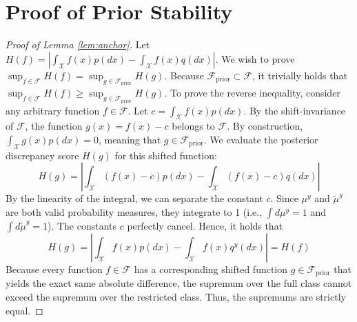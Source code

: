 \documentclass[twoside,11pt]{article}
\begin{document}
\section{Proof of Prior Stability}
\label{sec:appendix_prior_proof}
\begin{proof}[Proof of Lemma \ref{lem:anchor}]
    Let $H(f) = \left| \int_{\mathcal{X}} f(x) p(dx) - \int_{\mathcal{X}} f(x) q(dx) \right|$. We wish to prove $\sup_{f \in \mathcal{F}} H(f) = \sup_{g \in \mathcal{F}_{\text{prior}}} H(g)$. Because $\mathcal{F}_{\text{prior}} \subset \mathcal{F}$, it trivially holds that $\sup_{f \in \mathcal{F}} H(f) \ge \sup_{g \in \mathcal{F}_{\text{prior}}} H(g)$. To prove the reverse inequality, consider any arbitrary function $f \in \mathcal{F}$. Let $c = \int_{\mathcal{X}} f(x) p(dx)$. By the shift-invariance of $\mathcal{F}$, the function $g(x) = f(x) - c$ belongs to $\mathcal{F}$. By construction, $\int_{\mathcal{X}} g(x) p(dx) = 0$, meaning that $g \in \mathcal{F}_{\text{prior}}$. We evaluate the posterior discrepancy score $H(g)$ for this shifted function:$$H(g) = \left| \int_{\mathcal{X}} (f(x) - c) p(dx) - \int_{\mathcal{X}} (f(x) - c) q(dx) \right|$$ 
    By the linearity of the integral, we can separate the constant $c$. Since $\mu^y$ and $\tilde{\mu}^y$ are both valid probability measures, they integrate to 1 (i.e., $\int d\mu^y = 1$ and $\int d\tilde{\mu}^y = 1$). The constants $c$ perfectly cancel. Hence, it holds that $$H(g) = \left| \int_{\mathcal{X}} f(x) p(dx) - \int_{\mathcal{X}} f(x) q^y(dx) \right| = H(f)$$
    Because every function $f \in \mathcal{F}$ has a corresponding shifted function $g \in \mathcal{F}_{\text{prior}}$ that yields the exact same absolute difference, the supremum over the full class cannot exceed the supremum over the restricted class. Thus, the supremums are strictly equal.
\end{proof}
\end{document}
